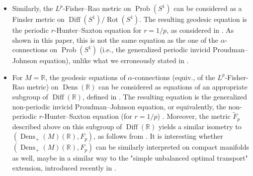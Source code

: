 \documentclass[11pt]{amsart}
\theoremstyle{definition}
\newcommand{\R}{\mathbb R}
\newcommand{\Dens}{\operatorname{Dens}_+(M)}
\begin{document}
\begin{itemize}
\[\]
as was first shown in \cite{lenells2014amari}.
See \cite{sarria2013blow,kogelbauer2020global} and the references therein for analysis of this equation, also beyond the range $\alpha \in (-1,1)$.
\item Similarly, the $L^p$-Fisher--Rao metric on $\operatorname{Prob}(S^1)$ can be considered as a Finsler metric on $\operatorname{Diff}(S^1)/\operatorname{Rot}(S^1)$.
The resulting geodesic equation is the periodic $r$-Hunter--Saxton equation for $r=1/p$, as considered in \cite{cotter2020r,bauer2022geometric}.
As shown in this paper, this is not the same equation as the one of the $\alpha$-connections on $\operatorname{Prob}(S^1)$ (i.e., the generalized periodic invicid Proudman--Johnson equation), unlike what we erroneously stated in \cite{bauer2022geometric}. 
\item For $M = \R$, the geodesic equations of $\alpha$-connections (equiv., of the $L^p$-Fisher-Rao metric) on $\operatorname{Dens}(\R)$ can be considered as equations of an appropriate subgroup of $\operatorname{Diff}(\R)$, defined in \cite{bauer2022geometric}.
The resulting equation is the generalized non-periodic invicid Proudman--Johnson equation, or equivalently, the non-periodic $r$-Hunter--Saxton equation (for $r = 1/p$) \cite{cotter2020r}.
Moreover, the metric $\tilde F_p$ described above on this subgroup of $\operatorname{Diff}(\R)$ yields a similar isometry to $(\Dens(\R),F_p)$, as follows from \cite{bauer2022geometric}.
It is interesting whether $(\Dens(\R),F_p)$ can be similarly interpreted on compact manifolds as well, maybe in a similar way to the "simple unbalanced optimal transport" extension, introduced recently in \cite{khesin2023simple}.
\end{itemize}
\end{document}
